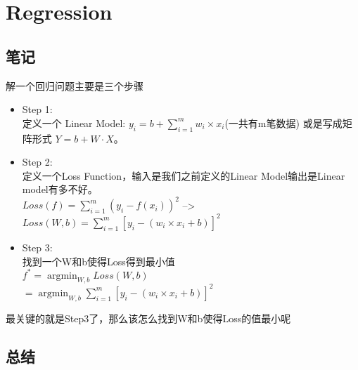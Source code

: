 \chapter{Regression}
\section{笔记}
解一个回归问题主要是三个步骤
\begin{itemize}
    \item Step 1:\\ 
    定义一个 Linear Model: $y_i = b + \sum_{i=1}^{m}w_i \times x_i$(一共有m笔数据) 或是写成矩阵形式
    $Y = b + W \cdot X$。
    \item Step 2: \\
    定义一个Loss Function，输入是我们之前定义的Linear Model输出是Linear model有多不好。
    \\
    $Loss(f) = \sum_{i=1}^{m}(y_i - f(x_i))^2$ --> 
    $Loss(W, b) = \sum_{i=1}^{m}[y_i - (w_i \times x_i + b)]^2$
    \item Step 3:\\
    找到一个W和b使得Loss得到最小值
    \\
    $f^* = \mathop{\arg\min}_{W,b}Loss(W,b) $\\$ = \mathop{\arg\min}_{W, b}\sum_{i=1}^{m}[y_i - (w_i \times x_i + b)]^2$
\end{itemize}
最关键的就是Step3了，那么该怎么找到W和b使得Loss的值最小呢
\section{总结}